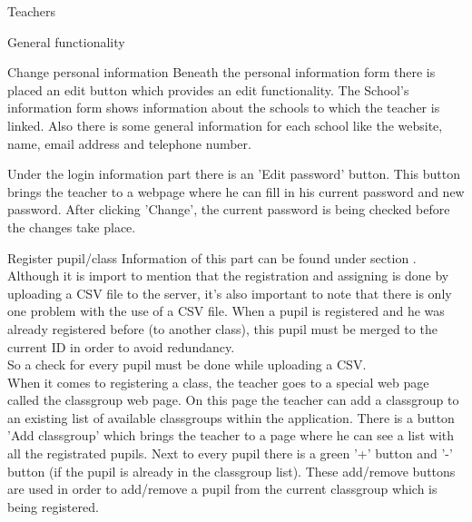 \begin{section}{Teachers}
\begin{subsection}{General functionality}
\begin{subsubsection}{Change personal information}
            Beneath the personal information form there is placed an edit button
            which provides an edit functionality. The School's information form
            shows information about the schools to which the teacher is linked.
            Also there is some general information for each school like the
            website, name, email address and telephone number.

            Under the login information part there is an 'Edit password' button. 
            This button brings the teacher to a webpage where he can fill in his current password and new password. 
            After clicking 'Change', the current password is being checked before the changes take place.
        \end{subsubsection}
        \begin{subsubsection}{Register pupil/class}
            Information of this part can be found under section .\\
            Although it is import to mention that the registration and assigning is done by uploading a CSV file to the server, it's also important to note that there is only one problem with the use of a CSV file. When a pupil is registered and he	was already registered before (to another class), this pupil must be merged to the current ID in order to avoid
            redundancy.\\
            So a check for every pupil must be done while uploading a CSV. \\
            When it comes to registering a class, the teacher goes to a special web page called the classgroup web page. On this page
            the teacher can add a classgroup to an existing list of available classgroups within the application. There is a button
            'Add classgroup' which brings the teacher to a page where he can see a list with all the registrated pupils. Next to every
            pupil there is a green '+' button and '-' button (if the pupil is already in the classgroup list). These add/remove buttons
            are used in order to add/remove a pupil from the current classgroup which is being registered.\\
            \begin{figure}[!h]
                \centering

\end{figure}
\end{subsubsection}
\end{subsection}
\end{section}
